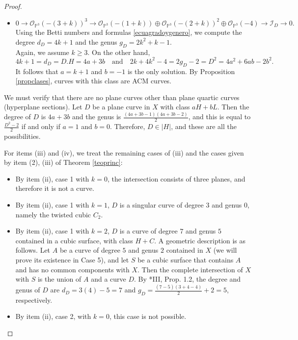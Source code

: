 \documentclass[12pt,reqno]{amsart}
\theoremstyle{plain}
\theoremstyle{definition}
\theoremstyle{remark}
\theoremstyle{definition}
\newcommand{\PP}{\mathds{P}}
\newcommand{\PPP}{\PP^{3}}
\newcommand{\ii}{\mathscr{I}}
\newcommand{\oo}{\mathcal{O}}
\begin{document}
\begin{proof}
\begin{itemize}
 \item[Case 2:]  
 $$0\to \oo_{\PPP}(-(3+k))^{3}\to \oo_{\PPP}(-(1+k))\oplus \oo_{\PPP}(-(2+k))^{2}\oplus \oo_{\PPP}(-4)\to \ii_{D}\to 0.$$
    Using the Betti numbers and formulas \eqref{ecuagradoygenero}, we compute the degree $d_{D}=4k+1$ and the genus $g_{D}=2k^{2}+k-1$.\\
    Again, we assume $k\geq 3$. On the other hand,
$$4k+1=d_{D}=D.H=4a+3b \quad \text{and} \quad 2k+4k^{2}-4=2g_{D}-2=D^{2}=4a^{2}+6ab-2b^{2}.$$
    It follows that $a=k+1$ and $b=-1$ is the only solution. By Proposition \ref{propclases}, curves with this class are ACM curves.
\end{itemize}

We must verify that there are no plane curves other than plane quartic curves (hyperplane sections). Let $D$ be a plane curve in $X$ with class $aH+bL$. Then the degree of $D$ is $4a+3b$ and the genus is $\frac{(4a+3b-1)(4a+3b-2)}{2}$, and this is equal to $\frac{D^{2}-2}{2}$ if and only if $a=1$ and $b=0$. Therefore, $D\in |H|$, and these are all the possibilities.

For items (iii) and (iv), we treat the remaining cases of (iii) and the cases given by item (2), (iii) of Theorem \ref{teoprinc}:
\begin{itemize}
    \item[Case 1:] By item (ii), case 1 with $k=0$, the intersection consists of three planes, and therefore it is not a curve.
    
    \item[Case 2:] By item (ii), case 1 with $k=1$, $D$ is a singular curve of degree $3$ and genus $0$, namely the twisted cubic $C_{2}$.
    
    \item[Case 3:] By item (ii), case 1 with $k=2$, $D$ is a curve of degree $7$ and genus $5$ contained in a cubic surface, with class $H+C$. A geometric description is as follows. Let $A$ be a curve of degree $5$ and genus $2$ contained in $X$ (we will prove its existence in Case 5), and let $S$ be a cubic surface that contains $A$ and has no common components with $X$. Then the complete intersection of $X$ with $S$ is the union of $A$ and a curve $D$. By \cite{mdp2}*{III, Prop. 1.2}, the degree and genus of $D$ are $d_{D}=3(4)-5=7$ and $g_{D}=\frac{(7-5)(3+4-4)}{2}+2=5$, respectively.
    
    \item[Case 4:] By item (ii), case 2, with $k=0$, this case is not possible.
    

\end{itemize}
\end{proof}
\end{document}
